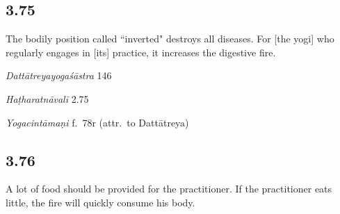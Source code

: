 \begin{ekdosis}


\subsection*{3.75}
\begin{translation}[hp03_075]
The bodily position called “inverted" destroys all diseases. For [the yogi] who regularly engages in [its] practice, it increases the digestive fire.
\end{translation}

\begin{sources}[hp03_075]
\emph{Dattātreyayogaśāstra} 146
\begin{versinnote}
\end{versinnote}
\end{sources}

\begin{testimonia}[hp03_075]
\emph{Haṭharatnāvalī} 2.75
\begin{versinnote}
\end{versinnote}

\emph{Yogacintāmaṇi} f.~78r (attr.~to Dattātreya)
\begin{versinnote}
\end{versinnote}
\end{testimonia}



\subsection*{3.76}
\begin{translation}[hp03_076]
A lot of food should be provided for the practitioner. If the practitioner eats little, the fire will quickly consume his body.
\end{translation}


\end{ekdosis}

